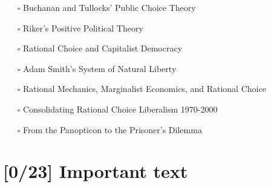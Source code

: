 \documentclass[paper=B6,portrait,twoside=true,twocolumn=false,headinclude=true,footinclude=false,fontsize=12,BCOR=10mm,DIV=calc,pagesize=auto,titlepage=firstiscover,mpinclude=false,headings=normal,headings=twolinechapter,open=right,toc=graduated,chapterprefix=false,numbers=endperiod,parskip=half+]{scrbook}
\theoremstyle{definition}
\begin{document}
\begin{enumerate}
\begin{itemize}
\item[{$\square$}] Buchanan and Tullocks' Public Choice Theory
\item[{$\square$}] Riker's Positive Political Theory
\item[{$\square$}] Rational Choice and Capitalist Democracy
\item[{$\square$}] Adam Smith's System of Natural Liberty
\item[{$\square$}] Rational Mechanics, Marginalist Economics, and Rational Choice
\item[{$\square$}] Consolidating Rational Choice Liberalism 1970-2000
\item[{$\square$}] From the Panopticon to the Prisoner's Dilemma
\end{itemize}
\end{enumerate}
\section{[0/23] Important text}
\label{sec:org1a66627}
\end{document}
